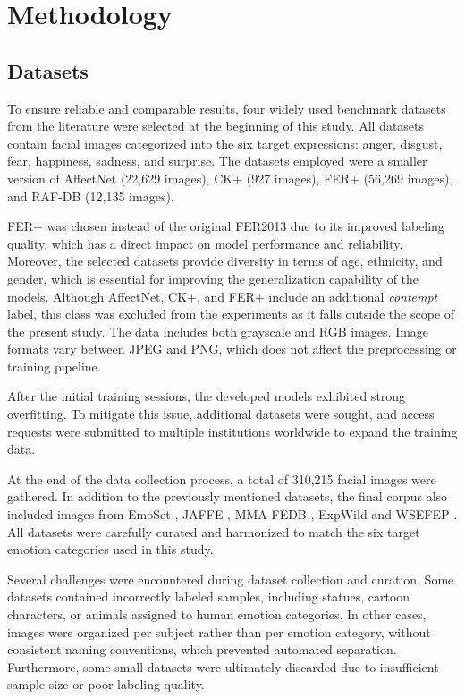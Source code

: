 \section{Methodology}
\label{sec:method}

\subsection{Datasets}

To ensure reliable and comparable results, four widely used benchmark datasets from the literature were selected at the beginning of this study. All datasets contain facial images categorized into the six target expressions: anger, disgust, fear, happiness, sadness, and surprise. The datasets employed were a smaller version of AffectNet \cite{affectnet} (22,629 images), CK+ \cite{ckplus}  (927 images), FER+ \cite{ferplus} (56,269 images), and RAF-DB \cite{rafdb} (12,135 images).

FER+ was chosen instead of the original FER2013 due to its improved labeling quality, which has a direct impact on model performance and reliability. Moreover, the selected datasets provide diversity in terms of age, ethnicity, and gender, which is essential for improving the generalization capability of the models. Although AffectNet, CK+, and FER+ include an additional \textit{contempt} label, this class was excluded from the experiments as it falls outside the scope of the present study. The data includes both grayscale and RGB images. Image formats vary between JPEG and PNG, which does not affect the preprocessing or training pipeline.

After the initial training sessions, the developed models exhibited strong overfitting. To mitigate this issue, additional datasets were sought, and access requests were submitted to multiple institutions worldwide to expand the training data.

At the end of the data collection process, a total of 310,215 facial images were gathered. In addition to the previously mentioned datasets, the final corpus also included images from EmoSet \cite{emoset}, JAFFE \cite{jaffe}, MMA-FEDB \cite{mma}, ExpWild \cite{expw} and WSEFEP \cite{wse-fep}. All datasets were carefully curated and harmonized to match the six target emotion categories used in this study.

Several challenges were encountered during dataset collection and curation. Some datasets contained incorrectly labeled samples, including statues, cartoon characters, or animals assigned to human emotion categories. In other cases, images were organized per subject rather than per emotion category, without consistent naming conventions, which prevented automated separation. Furthermore, some small datasets were ultimately discarded due to insufficient sample size or poor labeling quality.

